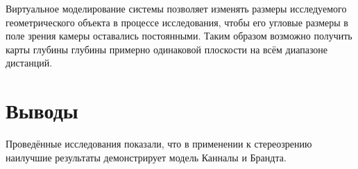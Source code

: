 Виртуальное моделирование системы позволяет изменять размеры исследуемого геометрического объекта в процессе исследования, чтобы его
угловые размеры в поле зрения камеры оставались постоянными. Таким образом возможно получить карты глубины глубины примерно одинаковой 
плоскости на всём диапазоне дистанций. 

\section{Выводы}
\label{conclusion}


Проведённые исследования показали, что в применении к стереозрению наилучшие результаты демонстрирует модель Канналы и Брандта.  

\newpage




